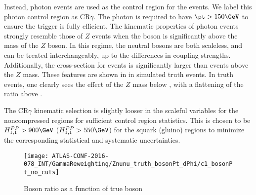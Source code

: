Instead, photon events are used as the control region for the \Zvv events.
We label this photon control region as CR$\gamma$.
The photon is required to have $\pt > 150 \GeV$ to ensure the trigger is fully efficient.
The kinematic properties of photon events strongly resemble those of $Z$ events when the boson \pt is significantly above the mass of the $Z$ boson.
In this regime, the neutral bosons are both scaleless, and can be treated interchangeably, up to the differences in coupling strengths.
Additionally, the cross-section for \gammajets events is significantly larger than \zjets events above the $Z$ mass.
These features are shown in  in simulated \Zvv truth events.
In truth events, one clearly sees the effect of the $Z$ mass below  \GeV, with a flattening of the ratio above  \GeV.

The CR$\gamma$ kinematic selection is slightly looser in the scaleful variables for the noncompressed regions for sufficient control region statistics.
This is chosen to be $\HFnm{PP}{1}{1} > 900 \GeV$ ($\HFnm{PP}{1}{1} > 550 \GeV$) for the squark (gluino) regions to minimize the corresponding statistical and systematic uncertainties.
\begin{figure}[tbp]
\caption{Boson \pt ratio as a function of true boson \pt} \label{fig:boson_pt_ratio}
\texttt{[image: ATLAS-CONF-2016-078\_INT/GammaReweighting/Znunu\_truth\_bosonPt\_dPhi/c1\_bosonPt\_no\_cuts]}
\end{figure}

